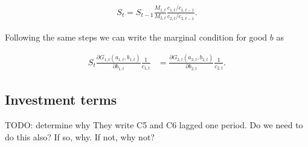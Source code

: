 \documentclass[10pt]{article}
\newcommand{\fracpd}[2]{
  \ensuremath{\frac{\partial #1}{\partial #2}}
}
\begin{document}
\begin{align} \label{eq:S_recursion}
  S_t = S_{t-1} \frac{M_{1,t}}{M_{2,t}} \frac{c_{1,t}/c_{1,t-1}}{c_{2,t}/c_{2,t-1}}.
\end{align}

Following the same steps we can write the marginal condition for good $b$ as

\begin{align} \label{eq:b_allocation}
  S_t \fracpd{G_{1,t}(a_{1,t}, b_{1,t})}{b_{1,t}} \frac{1}{c_{1,t}} &= \fracpd{G_{2,t}(a_{2,t}, b_{2,t})}{b_{2,t}} \frac{1}{c_{2,t}}.
\end{align}

\subsection{Investment terms} \label{sub:Investment terms}

TODO: determine why They write C5 and C6 lagged one period. Do we need to do this also? If so, why. If not, why not?
\end{document}

